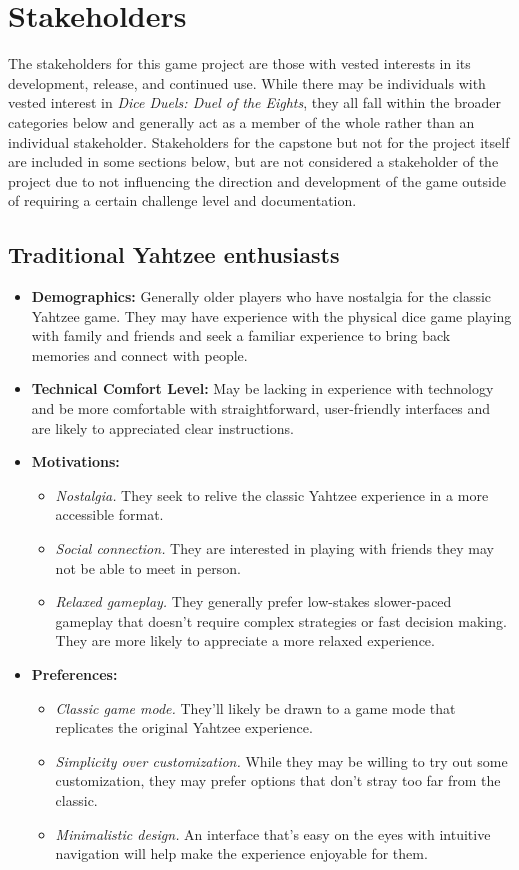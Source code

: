 \section{Stakeholders}

The stakeholders for this game project are those with vested interests in its development, release, and continued use. While there may be individuals with vested interest in \textit{Dice Duels: Duel of the Eights}, they all fall within the broader categories below and generally act as a member of the whole rather than an individual stakeholder. Stakeholders for the capstone but not for the project itself are included in some sections below, but are not considered a stakeholder of the project due to not influencing the direction and development of the game outside of requiring a certain challenge level and documentation.

\subsection{Traditional Yahtzee enthusiasts}

\begin{itemize}
	\item \textbf{Demographics:} Generally older players who have nostalgia for the classic Yahtzee game. They may have experience with the physical dice game playing with family and friends and seek a familiar experience to bring back memories and connect with people. 
	\item \textbf{Technical Comfort Level:} May be lacking in experience with technology and be more comfortable with straightforward,  user-friendly interfaces and are likely to appreciated clear instructions.
	\item \textbf{Motivations:}
	\begin{itemize}
		\item \textit{Nostalgia.} They seek to relive the classic Yahtzee experience in a more accessible format.
		\item \textit{Social connection.} They are interested in playing with friends they may not be able to meet in person.
		\item \textit{Relaxed gameplay.} They generally prefer low-stakes slower-paced gameplay that doesn't require complex strategies or fast decision making. They are more likely to appreciate a more relaxed experience.
	\end{itemize}
	\item \textbf{Preferences:}
	\begin{itemize}
		\item \textit{Classic game mode.} They'll likely be drawn to a game mode that replicates the original Yahtzee experience.
		\item \textit{Simplicity over customization.} While they may be willing to try out some customization, they may prefer options that don't stray too far from the classic.
		\item \textit{Minimalistic design.} An interface that's easy on the eyes with intuitive navigation will help make the experience enjoyable for them.
	\end{itemize}
\end{itemize}

